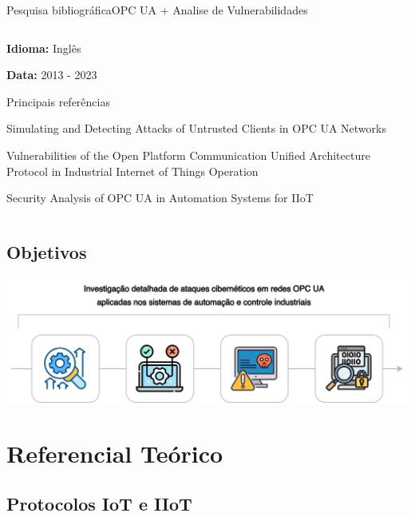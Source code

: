 \documentclass{uspBeamer}
\begin{document}
\begin{frame}{Pesquisa bibliográfica}{OPC UA + Analise de Vulnerabilidades}
\begin{columns}
\begin{column}{0.6\textwidth}
\begin{wideitemize}
                    \begin{wideitemize}
                        \item \textbf{Idioma:} Inglês
                        \item \textbf{Data:} 2013 - 2023
                    \end{wideitemize}
                    \item Principais referências
                    \begin{wideitemize}
                        \item Simulating and Detecting Attacks of Untrusted Clients in OPC UA Networks \cite{neu2019}
                        \item Vulnerabilities of the Open Platform Communication Unified Architecture Protocol in Industrial Internet of Things Operation \cite{shin2022}
                        \item Security Analysis of OPC UA in Automation Systems for IIoT \cite{varadarajan2022}
                    \end{wideitemize}
                \end{wideitemize}
            \end{column}
        \end{columns}
    \end{frame}
    
    \subsection{Objetivos}

    \begin{frame}
        \includegraphics[scale=0.9]{objetivos.png}
    \end{frame}

    \section{Referencial Teórico}
    \subsection{Protocolos IoT e IIoT}
\end{document}
